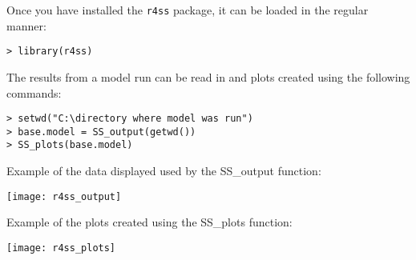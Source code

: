 Once you have installed the \texttt{r4ss} package, it can be loaded in the regular manner:

\begin{verbatim}
> library(r4ss)
\end{verbatim}

The results from a model run can be read in and plots created using the following commands:

\begin{verbatim}
> setwd("C:\directory where model was run")
> base.model = SS_output(getwd())
> SS_plots(base.model)
\end{verbatim}

\pagebreak
Example of the data displayed used by the SS\_output function:
\begin{center}
		\texttt{[image: r4ss\_output]}
\end{center}

\pagebreak
Example of the plots created using the SS\_plots function:
\begin{center}
	\texttt{[image: r4ss\_plots]}
\end{center}

